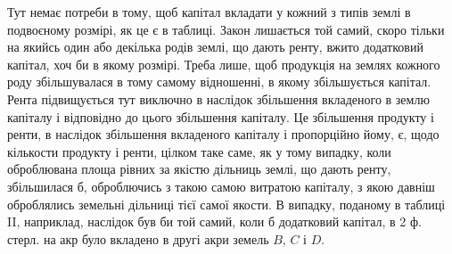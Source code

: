 Тут немає потреби в тому, щоб капітал вкладати у кожний з типів землі
в подвоєному розмірі, як це є в таблиці. Закон лишається той самий, скоро
тільки на якийсь один або декілька родів землі, що дають ренту, вжито додатковий капітал, хоч би в
якому розмірі. Треба лише, щоб продукція на землях
кожного роду збільшувалася в тому самому відношенні, в якому збільшується
капітал. Рента підвищується тут виключно в наслідок збільшення вкладеного
в землю капіталу і відповідно до цього збільшення капіталу. Це збільшення
продукту і ренти, в наслідок збільшення вкладеного капіталу і пропорційно
йому, є,  щодо кількости продукту і ренти, цілком таке саме, як у тому випадку,
коли оброблювана площа рівних за якістю дільниць землі, що дають ренту,
збільшилася б, оброблючись з такою самою витратою капіталу, з якою давніш оброблялись земельні
дільниці тієї самої якости. В випадку, поданому в таблиці II, наприклад, наслідок був би той самий,
коли б додатковий капітал,
в 2 ф. стерл. на акр було вкладено в другі акри земель $B$, $C$ і $D$.
